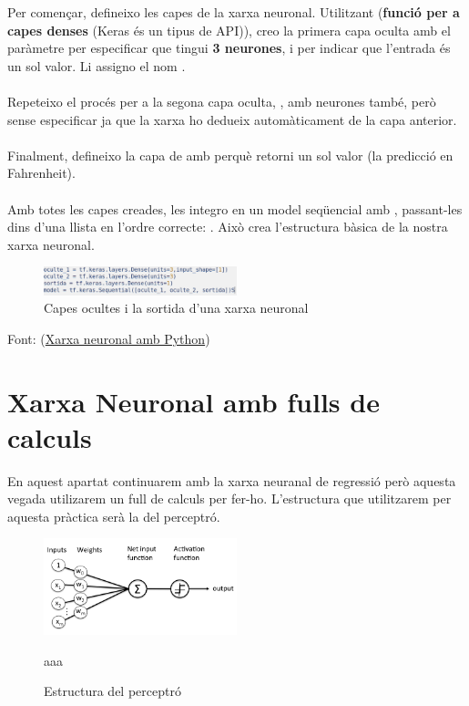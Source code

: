 Per començar, defineixo les capes de la xarxa neuronal. Utilitzant  (\textbf{funció per a capes denses} (Keras és un tipus de API)), creo la primera capa oculta amb el paràmetre  per especificar que tingui \textbf{3 neurones}, i  per indicar que l'entrada és un sol valor. Li assigno el nom .\\ \\
Repeteixo el procés per a la segona capa oculta, , amb  neurones també, però sense especificar  ja que la xarxa ho dedueix automàticament de la capa anterior.\\ \\
Finalment, defineixo la capa de  amb  perquè retorni un sol valor (la predicció en Fahrenheit).\\ \\
Amb totes les capes creades, les integro en un model seqüencial amb , passant-les dins d'una llista \boxed{[ ]} en l'ordre correcte: . Això crea l'estructura bàsica de la nostra xarxa neuronal.


\begin{figure}[H]
    \centering
    \includegraphics[width=0.5\textwidth]{./figures/3.png}
    \caption{Capes ocultes i la sortida d'una xarxa neuronal}
\end{figure}




Font: (\href{https://www.youtube.com/watch?v=iX_on3VxZzkhttps://www.youtube.com/watch?v=iX_on3VxZzk}{Xarxa neuronal amb Python})





\section{Xarxa Neuronal amb fulls de calculs}\label{sec:11}
En aquest apartat continuarem amb la xarxa neuranal de regressió però aquesta vegada utilizarem un full de calculs per fer-ho.
L'estructura que utilitzarem per aquesta pràctica serà la del perceptró.

\begin{figure}[H]
    \centering
    \includegraphics[width=0.5\textwidth]{./figures/perceptro.png}
    \caption{Estructura del perceptró}aaa
\end{figure}


